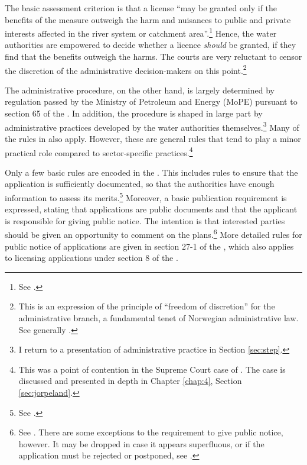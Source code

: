 The basic assessment criterion is that a license ``may be granted only if the benefits of the measure outweigh the harm and nuisances to public and private interests affected in the river system or catchment area''.\footnote{See \cite[25]{wra00}.} Hence, the water authorities are empowered to decide whether a licence {\it should} be granted, if they find that the benefits outweigh the harms. The courts are very reluctant to censor the discretion of the administrative decision-makers on this point.\footnote{This is an expression of the principle of ``freedom of discretion'' for the administrative branch, a fundamental tenet of Norwegian administrative law. See generally \cite[71-74]{eckhoff14}.}

The administrative procedure, on the other hand, is largely determined by regulation passed by the Ministry of Petroleum and Energy (MoPE) pursuant to section 65 of the \cite{wra00}. In addition, the procedure is shaped in large part by administrative practices developed by the water authorities themselves.\footnote{I return to a presentation of administrative practice in Section \ref{sec:step}.} Many of the rules in \cite{paa67} also apply. However, these are general rules that tend to play a minor practical role compared to sector-specific practices.\footnote{This was a point of contention in the Supreme Court case of \cite{jorpeland11}. The case is discussed and presented in depth in Chapter \ref{chap:4}, Section \ref{sec:jorpeland}.}

Only a few basic rules are encoded in the \cite{wra00}. This includes rules to ensure that the application is sufficiently documented, so that the authorities have enough information to assess its merits.\footnote{See \cite[23]{wra00}.} Moreover, a basic publication requirement is expressed, stating that applications are public documents and that the applicant is responsible for giving public notice. The intention is that interested parties should be given an opportunity to comment on the plans.\footnote{See \cite[24]{wra00}. There are some exceptions to the requirement to give public notice, however. It may be dropped in case it appears superfluous, or if the application must be rejected or postponed, see \cite[24a-24c]{wra00}.} More detailed rules for public notice of applications are given in section 27-1 of the \cite{pb08}, which also applies to licensing applications under section 8 of the \cite{wra00}.

